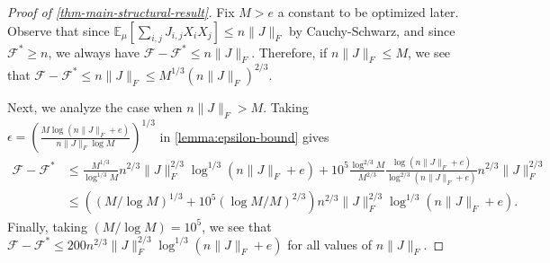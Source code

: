 \documentclass[final, 12pt]{colt2018}
\newcommand{\bE}{\mathbb{E}}
\newcommand{\F}{\mathcal{F}}
\newcommand{\E}{\bE}      %
\newtheorem{theorem}{Theorem}[section]
\theoremstyle{definition}
\theoremstyle{plain}
\begin{document}
\begin{proof}[Proof of \cref{thm-main-structural-result}]
Fix $M > e$ a constant to be optimized later. 
Observe that since $\E_{\mu}[\sum_{i,j} J_{i,j}X_i X_j] \leq n \|J\|_{F}$ by Cauchy-Schwarz, and since $\F^* \geq n$, we always have $\F - \F^* \leq n\|J\|_F$. Therefore, if $n \|J\|_F \le M$, we see that $\mathcal{F} - \mathcal{F}^* \le n \|J\|_F \le M^{1/3} (n \|J\|_F)^{2/3}$.

Next, we analyze the case when $n \|J\|_F > M$.
Taking $\epsilon = \left(\frac{M\log(n \|J\|_F + e)}{n \|J\|_F \log{M}}\right)^{1/3}$ in \cref{lemma:epsilon-bound} gives
\begin{align*}
\mathcal{F} - \mathcal{F}^* 
&\le \frac{M^{1/3}}{\log^{1/3} M} n^{2/3} \|J\|_F^{2/3} \log^{1/3}(n \|J\|_F + e)  + 10^5\frac{\log^{2/3} M}{M^{2/3}} \frac{\log(n \|J\|_F + e)}{\log^{2/3}(n \|J\|_F + e)} n^{2/3} \|J\|_F^{2/3} \\
&\le \left((M/\log M)^{1/3} + 10^5 (\log M/M)^{2/3}\right) n^{2/3} \|J\|_F^{2/3} \log^{1/3}(n \|J\|_F + e).
\end{align*}
Finally, taking $(M/\log M) = 10^{5}$, we see that $\mathcal{F} - \mathcal{F}^* \le 200 n^{2/3} \|J\|_F^{2/3} \log^{1/3}(n \|J\|_F + e)$  for all values of $n \|J\|_F$.
\end{proof}

\begin{comment}
\begin{proof}[Proof of \cref{thm-mrf-main-structural-result}]
The proof is exactly the same as that of Theorem~\ref{thm-main-structural-result},
except that for each $d$ from $1$ to $r$, we use the following generalized
weak regularity lemma to decompose $J_{=d}$:
\begin{theorem}
\citep{alon-etal-samplingCSP-journal}\label{reg-alon-etal-mrf}
Let $J$ be an arbitrary $k$-dimensional matrix on $X_{1}\times\dots\times X_{k}$,
where we assume that $k\geq 1$ is fixed. Let $N:=|X_{1}|\times\dots\times|X_{k}|$
and let $\epsilon>0$. Then, in time $2^{O(1/\epsilon^{2})}O(N)$
and with probability at least $0.99$, we can find a cut decomposition of
width at most $4/\epsilon^{2}$, error at most $\epsilon\sqrt{N}\|J\|_F$,
and the following modified bound on coefficient length: $\sum_i |d_i| \le 2\|J\|_F/\epsilon\sqrt{N}$, where $(d_i)_{i =1}^s$ are the coefficients of
the cut arrays.
\end{theorem}

We omit further details. 
\end{proof}
\end{comment}
\end{document}
